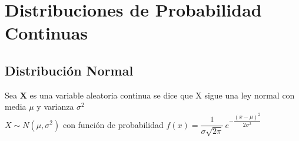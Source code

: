 \section{Distribuciones de Probabilidad Continuas}

    \subsection{Distribución Normal}
    Sea \textbf{X} es una variable aleatoria continua se dice que X sigue una ley normal con media\textbf{ $\mu$ }y varianza
    \textbf{ ${\sigma}^{2}$}\\
    
    $X \sim N(\mu,{\sigma}^{2} )$ con función de probabilidad {\color{usm} $f(x)=\dfrac{1}{\sigma\sqrt{2\pi}}\,e^{-\dfrac{(x-\mu)^2}{2\sigma{}^2}}$}
    
